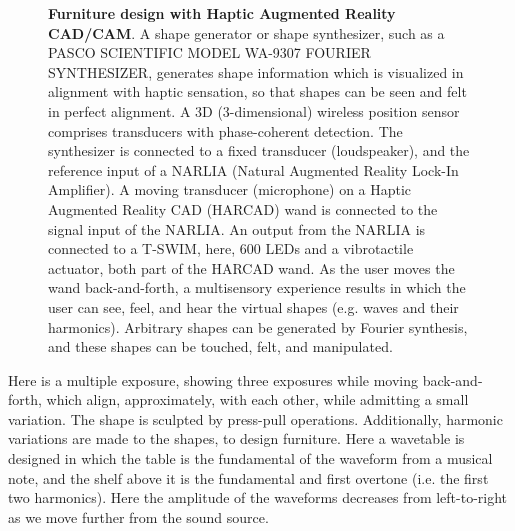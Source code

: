 \begin{figure}
  \caption{
           {\bf Furniture design with Haptic Augmented Reality
                CAD/CAM}.
           A shape generator or shape synthesizer, such as
           a PASCO SCIENTIFIC MODEL WA-9307 FOURIER SYNTHESIZER,
           generates shape information which is visualized in alignment
           with haptic sensation, so that shapes can be seen and felt in
           perfect alignment.
           A 3D (3-dimensional) wireless position sensor comprises
           transducers with phase-coherent detection.
           The synthesizer is connected to a fixed transducer (loudspeaker),
           and the reference input of a NARLIA (Natural Augmented Reality
           Lock-In Amplifier).  A moving transducer (microphone) on a
           Haptic Augmented Reality CAD (HARCAD) wand is connected to the
           signal input of the NARLIA.
           An output from the NARLIA is connected to a T-SWIM, here, 600
           LEDs and a vibrotactile actuator, both part of the HARCAD wand.
           As the user moves the wand back-and-forth, a multisensory
           experience results in which the user can see, feel, and
           hear the virtual shapes (e.g. waves and their harmonics).
           Arbitrary shapes can be generated by Fourier synthesis,
           and these shapes can be touched, felt, and manipulated.
          }
  \label{fig:wavetable}
\end{figure}
Here is a multiple exposure, showing three exposures while
moving back-and-forth, which align, approximately, with each other,
while admitting a small variation.
The shape is sculpted by press-pull operations.
Additionally, harmonic variations are made to the shapes, to
design furniture.
Here a wavetable is designed in which the table is the
fundamental of the waveform from a musical note, and the shelf
above it is the fundamental and first overtone
(i.e. the first two harmonics).
Here the amplitude of the waveforms decreases from left-to-right
as we move further from the sound source.

